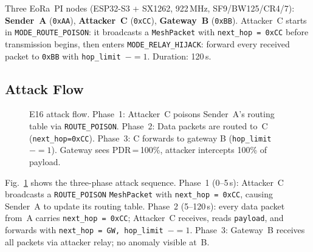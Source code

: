 \documentclass[journal]{IEEEtran}
\begin{document}
Three EoRa~PI nodes (ESP32-S3 + SX1262, 922\,MHz, SF9/BW125/CR4/7):
\textbf{Sender~A} (\texttt{0xAA}), \textbf{Attacker~C} (\texttt{0xCC}),
\textbf{Gateway~B} (\texttt{0xBB}). Attacker~C starts in
\texttt{MODE\_ROUTE\_POISON}: it broadcasts a \texttt{MeshPacket} with
\texttt{next\_hop = 0xCC} before transmission begins, then enters
\texttt{MODE\_RELAY\_HIJACK}: forward every received packet to \texttt{0xBB}
with \texttt{hop\_limit $-= 1$}. Duration: 120\,s.

\subsection{Attack Flow}

\begin{figure}[t]
  \centering
  \caption{E16 attack flow. Phase~1: Attacker~C poisons Sender~A's routing
    table via \texttt{ROUTE\_POISON}. Phase~2: Data packets are routed to~C
    (\texttt{next\_hop=0xCC}). Phase~3: C forwards to gateway B
    (\texttt{hop\_limit}$-=1$). Gateway sees PDR\,=\,100\%, attacker
    intercepts 100\% of payload.}
  \label{fig:e16-flow}
\end{figure}

Fig.~\ref{fig:e16-flow} shows the three-phase attack sequence.
Phase~1 (0--5\,s): Attacker~C broadcasts a \texttt{ROUTE\_POISON}
\texttt{MeshPacket} with \texttt{next\_hop = 0xCC}, causing Sender~A to
update its routing table. Phase~2 (5--120\,s): every data packet from~A
carries \texttt{next\_hop = 0xCC}; Attacker~C receives, reads \texttt{payload},
and forwards with \texttt{next\_hop = GW, hop\_limit $-= 1$}. Phase~3:
Gateway~B receives all packets via attacker relay; no anomaly visible at~B.
\end{document}
